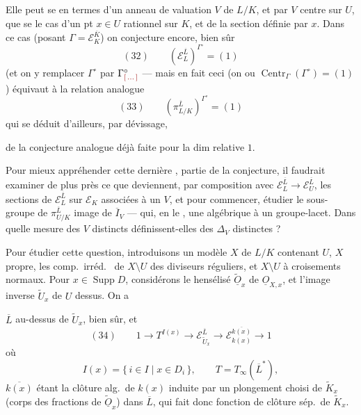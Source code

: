 \documentclass[11pt,a4paper]{article}
\begin{document}
Elle peut se  en termes d'un anneau de valuation $V$ de $L/K$, et par $V$  centre sur $U$,  que se   le cas d'un pt $x \in U$ rationnel sur $K$, et de la section définie par $x$. Dans ce cas (posant $\Gamma = \mathcal{E}_K^{\overline{K}}$) on conjecture encore, bien sûr
\[
  (32) \qquad (\mathcal{E}_L^{\overline{L}})^{\Gamma^{\circ}} = (1)
\]
(et on  y remplacer $\Gamma^{\circ}$ par $\Gamma^{\circ}_{\ill{}}$ — mais en fait ceci (on  ou $\operatorname{Centr}_{\Gamma}(\Gamma^{\circ}) = (1)$) équivaut à la relation analogue 
\[
  (33) \qquad (\pi_{L/K}^{\overline{L}})^{\Gamma^{\circ}} = (1)
\]
qui se déduit d'ailleurs, par dévissage,

de la conjecture analogue déjà faite pour la dim relative $1$.

Pour mieux appréhender cette dernière , partie de la conjecture, il faudrait examiner de plus près ce que deviennent, par composition avec $\mathcal{E}_L^{\overline{L}} \to \mathcal{E}_U^{\overline{L}}$, les sections de $\mathcal{E}_L^{\overline{L}}$ sur $\mathcal{E}_K$ associées à un $V$, et pour commencer, étudier le  sous-groupe de $\pi_{U/K}^{\overline{L}}$ image de $\overline{I}_V$ — qui, en le ,  une  algébrique  \ill{} à un groupe-lacet. Dans quelle mesure des $V$ distincts définissent-elles des $\Delta_V$ distinctes ?

Pour étudier cette question, introduisons un modèle $X$ de $L/K$ contenant $U$, $X$ propre, les comp.\ irréd.\  de  $X \setminus U$ des diviseurs réguliers, et $X \setminus U$ à croisements normaux. Pour $x \in \operatorname{Supp} D$, considérons le hensélisé  $\widetilde{\underline{O}}_x$ de $\underline{O}_{X,x}$, et l'image inverse $\widetilde{U}_x$ de $U$ dessus. On a


$\overline{L}$ au-dessus de $\widetilde{U}_x$, bien sûr, et
\[
  (34) \qquad 1 \to T^{I(x)} \to \mathcal{E}_{\widetilde{U}_x}^{\overline{L}} \longrightarrow \mathcal{E}_{k(x)}^{\overline{k(x)}} \to 1
\]
où 
\[
  I(x) = \{\, i \in I \mid x \in D_i \,\}, \qquad T = T_{\infty}(\overline{L}^{*}),
\]
$\overline{k(x)}$ étant la clôture alg.\ de $k(x)$ induite par un plongement choisi de $\widetilde{K}_x$ (corps des fractions de $\widetilde{\underline{O}}_x$) dans $\overline{L}$, qui fait donc fonction de clôture sép.\ de $\widetilde{K}_x$.
\end{document}
